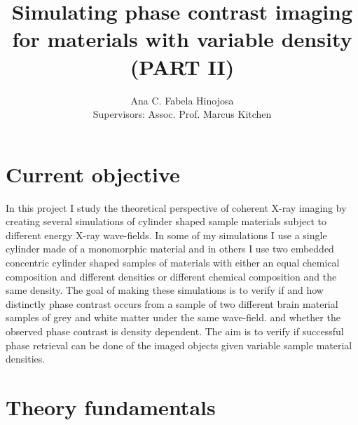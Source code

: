 \documentclass[9pt, a4paper]{article}
\title{Simulating phase contrast imaging for materials with variable density (PART II)}
\author{Ana C. Fabela Hinojosa \\
\small{Supervisors: Assoc. Prof. Marcus Kitchen}}
\begin{document}
\maketitle
\section{Current objective}
In this project I study the theoretical perspective of coherent X-ray imaging by creating several simulations of cylinder shaped sample materials subject to different energy X-ray wave-fields. In some of my simulations I use a single cylinder made of a monomorphic material and in others I use two embedded concentric cylinder shaped samples of materials with either an equal chemical composition and different densities or different chemical composition and the same density. 
The goal of making these simulations is to verify if and how distinctly phase contrast occurs from a sample of two different brain material samples of grey and white matter under the same wave-field. and whether the observed phase contrast is density dependent. The aim is to verify if successful phase retrieval can be done of the imaged objects given variable sample material densities.

\section{Theory fundamentals}
\end{document}
